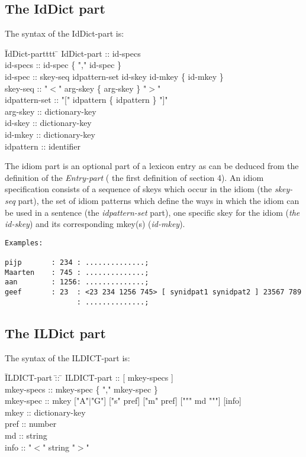 \subsection {The IdDict part}

The syntax of the IdDict-part is:

\begin {tabbing}
   \= IdDict-partttt \= \kill
   \> IdDict-part \> :: id-specs \\
   \> id-specs    \> :: id-spec \{ "," id-spec \} \\
   \> id-spec     \> :: skey-seq idpattern-set id-skey id-mkey \{ id-mkey \} \\
   \> skey-seq   \> :: "$<$" arg-skey \{ arg-skey \} "$>$"\\
   \> idpattern-set\> :: "[" idpattern \{ idpattern \} "]" \\
   \> arg-skey    \> :: dictionary-key \\
   \> id-skey    \> :: dictionary-key \\
   \> id-mkey    \> :: dictionary-key \\
   \> idpattern  \> :: identifier
\end {tabbing}

The idiom part is an optional part of
a lexicon entry as can be deduced from the definition of the
{\em Entry-part} ( the first definition of section 4).
An idiom specification consists of a sequence of skeys which occur in the
idiom (the {\em skey-seq} part), the set of idiom patterns which define the 
ways in which the idiom can be used in a sentence (the {\em idpattern-set} 
part), one specific skey for the idiom ({\em the id-skey}) and its 
corresponding mkey(s) ({\em id-mkey}).
\begin{verbatim}
Examples:

pijp       : 234 : ..............;
Maarten    : 745 : ..............;
aan        : 1256: ..............;
geef       : 23  : <23 234 1256 745> [ synidpat1 synidpat2 ] 23567 789
                 : ..............;
\end{verbatim}
\subsection {The ILDict part}

The syntax of the ILDICT-part is:

\begin {tabbing}
   \= ILDICT-part \= :: \= \kill
   \> ILDICT-part \> :: [ mkey-specs ] \\
   \> mkey-specs  \> :: mkey-spec \{ "," mkey-spec \} \\
   \> mkey-spec   \> :: mkey ["A"$|$"G"] ["s" pref] ["m" pref] [""" md """] [info]\\
   \> mkey        \> :: dictionary-key \\
   \> pref        \> :: number \\
   \> md          \> :: string \\
   \> info        \> :: "$<$" string "$>$"
\end {tabbing}

